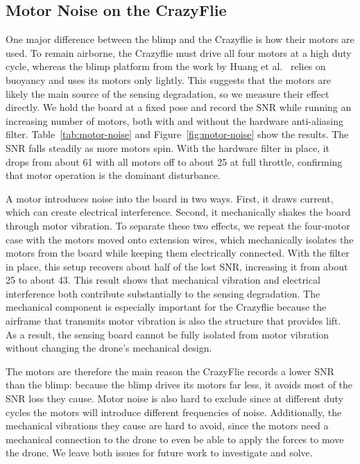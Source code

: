 \subsection{Motor Noise on the CrazyFlie}
\label{sec:motor-noise}

One major difference between the blimp and the Crazyflie is how their motors are used. To remain airborne, the Crazyflie must drive all four motors at a high duty cycle, whereas the blimp platform from the work by Huang et al.~\cite{huang2026lta} relies on buoyancy and uses its motors only lightly. This suggests that the motors are likely the main source of the sensing degradation, so we measure their effect directly. We hold the board at a fixed pose and record the SNR while running an increasing number of motors, both with and without the hardware anti-aliasing filter. Table~\ref{tab:motor-noise} and Figure~\ref{fig:motor-noise} show the results. The SNR falls steadily as more motors spin. With the hardware filter in place, it drops from about 61 with all motors off to about 25 at full throttle, confirming that motor operation is the dominant disturbance.


A motor introduces noise into the board in two ways. First, it draws current, which can create electrical interference. Second, it mechanically shakes the board through motor vibration. To separate these two effects, we repeat the four-motor case with the motors moved onto extension wires, which mechanically isolates the motors from the board while keeping them electrically connected. With the filter in place, this setup recovers about half of the lost SNR, increasing it from about 25 to about 43. This result shows that mechanical vibration and electrical interference both contribute substantially to the sensing degradation. The mechanical component is especially important for the Crazyflie because the airframe that transmits motor vibration is also the structure that provides lift. As a result, the sensing board cannot be fully isolated from motor vibration without changing the drone's mechanical design.


The motors are therefore the main reason the CrazyFlie records a lower SNR than the blimp: because the blimp drives its motors far less, it avoids most of the SNR loss they cause. Motor noise is also hard to exclude since at different duty cycles the motors will introduce different frequencies of noise. Additionally, the mechanical vibrations they cause are hard to avoid, since the motors need a mechanical connection to the drone to even be able to apply the forces to move the drone. We leave both issues for future work to investigate and solve.


